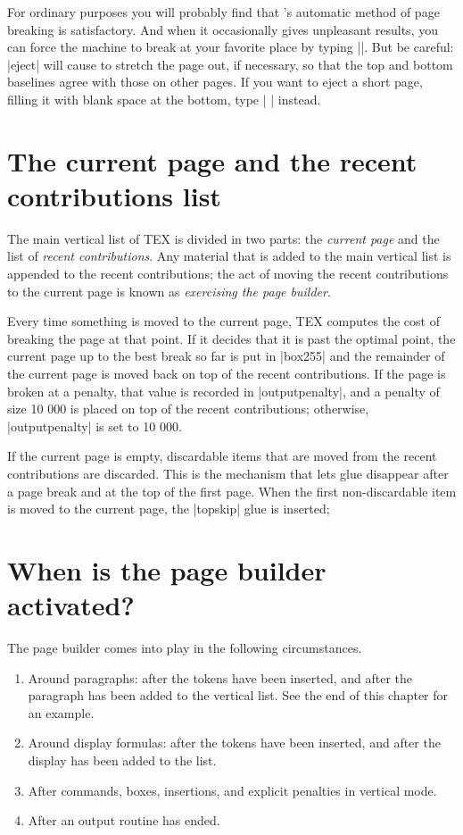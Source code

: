 For ordinary purposes you will probably find that \tex's automatic
method of page breaking is satisfactory. And when it occasionally gives unpleasant
results, you can force the machine to break at your favorite place by
typing |\eject|. But be careful: |eject| will cause \tex to stretch the page
out, if necessary, so that the top and bottom baselines agree with those on other
pages.  If you want to eject a short page, filling it with blank space at the bottom,
type | \vfill\eject|  instead.

\section{The current page and the recent contributions list}

The main vertical list of TEX is divided in two parts: the \emph{current page} and the list of \emph{recent
contributions}. Any material that is added to the main vertical list is appended to the recent
contributions; the act of moving the recent contributions to the current page is known as
\emph{exercising the page builder}.

Every time something is moved to the current page, TEX computes the cost of breaking the
page at that point. If it decides that it is past the optimal point, the current page up to the
best break so far is put in |box255| and the remainder of the current page is moved back
on top of the recent contributions. If the page is broken at a penalty, that value is recorded
in |outputpenalty|, and a penalty of size 10 000 is placed on top of the recent contributions;
otherwise, |outputpenalty| is set to 10 000.

If the current page is empty, discardable items that are moved from the recent contributions
are discarded. This is the mechanism that lets glue disappear after a page break and at the
top of the first page. When the first non-discardable item is moved to the current page, the
|topskip| glue is inserted; 



\section{When is the page builder activated?}


The page builder comes into play in the following circumstances.

\begin{enumerate}
\item  Around paragraphs: after the  tokens have been inserted, and after the
paragraph has been added to the vertical list. See the end of this chapter for an
example.

\item  Around display formulas: after the  tokens have been inserted, and after
the display has been added to the list.

\item  After  commands, boxes, insertions, and explicit penalties in vertical mode.

\item  After an output routine has ended.
\end{enumerate}



